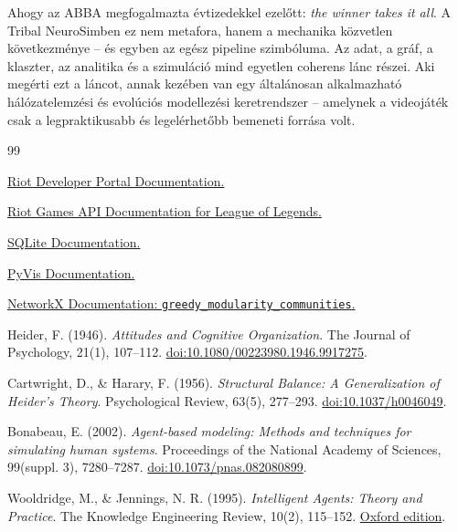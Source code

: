 ﻿\documentclass[a4paper,12pt]{report}
\begin{document}
Ahogy az ABBA megfogalmazta évtizedekkel ezelőtt: \textit{the winner takes it all}.
A Tribal NeuroSimben ez nem metafora, hanem a mechanika közvetlen következménye -- és egyben
az egész pipeline szimbóluma. Az adat, a gráf, a klaszter, az analitika és a szimuláció mind
egyetlen coherens lánc részei. Aki megérti ezt a láncot, annak kezében van egy általánosan
alkalmazható hálózatelemzési és evolúciós modellezési keretrendszer -- amelynek a videojáték
csak a legpraktikusabb és legelérhetőbb bemeneti forrása volt.

\begin{thebibliography}{99}

\href{https://developer.riotgames.com/docs/portal}{Riot Developer Portal Documentation.}

\href{https://developer.riotgames.com/docs/lol}{Riot Games API Documentation for League of Legends.}

\href{https://www.sqlite.org/docs.html}{SQLite Documentation.}

\href{https://pyvis.readthedocs.io/en/latest/documentation.html}{PyVis Documentation.}

\href{https://networkx.org/documentation/stable/reference/algorithms/generated/networkx.algorithms.community.modularity_max.greedy_modularity_communities.html}{NetworkX Documentation: \texttt{greedy\_modularity\_communities}.}

Heider, F. (1946). \textit{Attitudes and Cognitive Organization}. The Journal of Psychology, 21(1), 107--112. \href{https://doi.org/10.1080/00223980.1946.9917275}{doi:10.1080/00223980.1946.9917275}.

Cartwright, D., \& Harary, F. (1956). \textit{Structural Balance: A Generalization of Heider's Theory}. Psychological Review, 63(5), 277--293. \href{https://doi.org/10.1037/h0046049}{doi:10.1037/h0046049}.

Bonabeau, E. (2002). \textit{Agent-based modeling: Methods and techniques for simulating human systems}. Proceedings of the National Academy of Sciences, 99(suppl. 3), 7280--7287. \href{https://doi.org/10.1073/pnas.082080899}{doi:10.1073/pnas.082080899}.

Wooldridge, M., \& Jennings, N. R. (1995). \textit{Intelligent Agents: Theory and Practice}. The Knowledge Engineering Review, 10(2), 115--152. \href{https://www.cs.ox.ac.uk/people/michael.wooldridge/pubs/ker95/ker95-html.html}{Oxford edition}.


\end{thebibliography}
\end{document}

